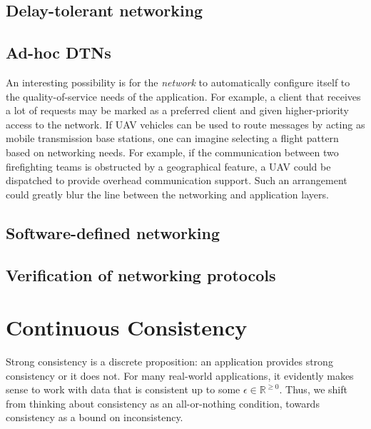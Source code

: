 \documentclass[]             %
{NASA}                       %
\theoremstyle{definition}
\begin{document}
\hypertarget{delay-tolerant-networking}{%
  \subsection{Delay-tolerant networking}\label{delay-tolerant-networking}}

\hypertarget{ad-hoc-dtns}{%
  \subsection{Ad-hoc DTNs}\label{ad-hoc-dtns}}

An interesting possibility is for the \emph{network} to automatically
configure itself to the quality-of-service needs of the application. For
example, a client that receives a lot of requests may be marked as a
preferred client and given higher-priority access to the network. If UAV
vehicles can be used to route messages by acting as mobile transmission
base stations, one can imagine selecting a flight pattern based on
networking needs. For example, if the communication between two
firefighting teams is obstructed by a geographical feature, a UAV could
be dispatched to provide overhead communication support. Such an
arrangement could greatly blur the line between the networking and
application layers.

\hypertarget{software-defined-networking}{%
  \subsection{Software-defined
    networking}\label{software-defined-networking}}

\hypertarget{verification-of-networking-protocols}{%
  \subsection{Verification of networking
    protocols}\label{verification-of-networking-protocols}}

\newpage

\hypertarget{continuous-consistency}{%
  \section{Continuous Consistency}\label{continuous-consistency}}

\label{sec:continuous-consistency}

Strong consistency is a discrete proposition: an application provides
strong consistency or it does not. For many real-world applications, it
evidently makes sense to work with data that is consistent up to some
\(\epsilon \in \mathbb{R}^{\geq 0}\). Thus, we shift from thinking about
consistency as an all-or-nothing condition, towards consistency as a
bound on inconsistency.
\end{document}
